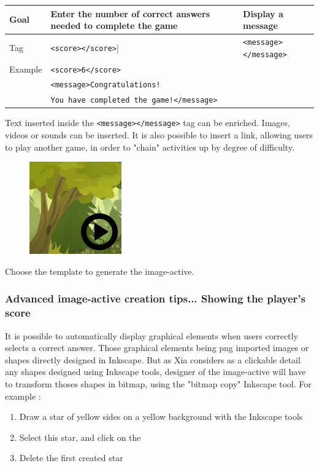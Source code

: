  \begin{tabular}{|l|p{2in}|p{2in}|}
 \hline
  Goal & Enter the number of correct answers needed to complete the game & Display a message\\
  \hline
  Tag & \texttt{<score></score>}| & \texttt{<message></message>}\\
  \hline
  Example & \multicolumn{2}{|l|}{\texttt{<score>6</score>}}\\
   & \multicolumn{2}{|l|}{\texttt{<message>Congratulations!}}\\
    & \multicolumn{2}{|l|}{\texttt{You have completed the game!</message>}}\\
  \hline
 \end{tabular}

 
\begin{astuce}
Text inserted inside the \verb|<message></message>| tag can be 
enriched. Images, videos or sounds can be inserted.
It is also possible to insert a link, allowing users to play another game,
in order to "chain" activities up by degree of difficulty.
\end{astuce}

\begin{figure}
  \centering
  \includegraphics[scale=0.7]{./images/game1clic} 
\end{figure}

Choose the template  to generate the image-active.


\subsubsection{Advanced image-active creation tips... Showing the player's score}\label{détail_progression}


It is possible to automatically display graphical elements when users correctly 
selects a correct answer. Those graphical elements being png imported images or 
shapes directly designed in Inkscape. But as Xia considers as a clickable 
detail any shapes designed using Inkscape tools, designer of the image-active 
will have to transform thoses shapes in bitmap, using the "bitmap copy" Inkscape tool. 
For example :
\begin{enumerate}
 \item Draw  a star of yellow sides on a yellow background with the Inkscape tools 
 \item Select this star, and click on the 
 \item Delete the first created star
\end{enumerate}

